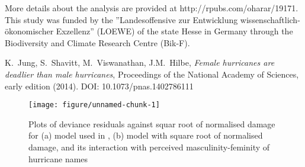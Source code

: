 \documentclass{pnastwo}\usepackage[]{graphicx}\usepackage[]{color}
\newenvironment{knitrout}{}{} %
\begin{document}
\begin{article}
\begin{acknowledgments}
More details about the analysis are provided at http://rpubs.com/oharar/19171. This study was funded by the ''Landesoffensive zur Entwicklung wissenschaftlich-\"{o}konomischer Exzellenz'' (LOEWE) of the state Hesse in Germany through the Biodiversity and Climate Research Centre (Bik-F).\end{acknowledgments}

\begin{thebibliography}{10}
K.~Jung, S.~Shavitt, M.~Viswanathan, J.M.~Hilbe, {\em Female hurricanes are deadlier than male hurricanes}, Proceedings of the National Academy of Sciences, early edition (2014). DOI: 10.1073/pnas.1402786111

\end{thebibliography}

\end{article}

\begin{figure}
\caption{Plots of deviance residuals against squar root of normalised damage for (a) model used in \cite{1}, (b) model with square root of normalised damage, and its interaction with perceived masculinity-feminity of hurricane names}
\label{fig:residplots}
\begin{knitrout}
\color{fgcolor}

{\centering \texttt{[image: figure/unnamed-chunk-1]} 

}



\end{knitrout}

\end{figure}
\end{document}
